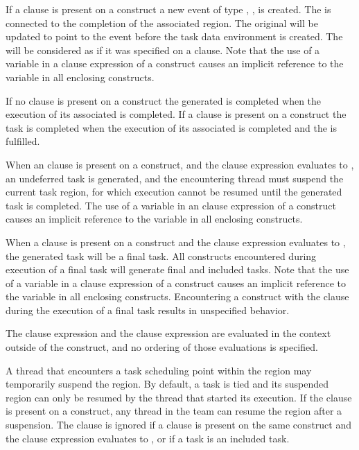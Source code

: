 If a  clause is present on a  construct a new event of type , , is created. The  is connected to the completion of the associated  region. The original  will be updated to point to the  event before the task data environment is created. The  will be considered as if it was specified on a  clause. Note that the use of a variable in a  clause expression of a  construct causes an implicit reference to the variable in all enclosing constructs.

If no  clause is present on a  construct the generated  is completed when the execution of its associated  is completed. If a  clause is present on a  construct the task is completed when the execution of its associated  is completed and the  is fulfilled.

When an  clause is present on a  construct, and the  clause expression
evaluates to , an undeferred task is generated, and the encountering thread must
suspend the current task region, for which execution cannot be resumed until the
generated task is completed. The use of a variable in an  clause expression
of a  construct causes an implicit reference to the variable in all enclosing
constructs.

When a  clause is present on a  construct and the  clause expression
evaluates to , the generated task will be a final task. All  constructs
encountered during execution of a final task will generate final and included tasks. Note
that the use of a variable in a  clause expression of a  construct causes an
implicit reference to the variable in all enclosing constructs. Encountering a  construct with the  clause
during the execution of a final task results in unspecified behavior.

The  clause expression and the  clause expression are evaluated in the context
outside of the  construct, and no ordering of those evaluations is specified.

A thread that encounters a task scheduling point within the  region may
temporarily suspend the  region. By default, a task is tied and its suspended 
region can only be resumed by the thread that started its execution. If the 
clause is present on a  construct, any thread in the team can resume the 
region after a suspension. The  clause is ignored if a  clause is present
on the same  construct and the  clause expression evaluates to , or if a
task is an included task.

